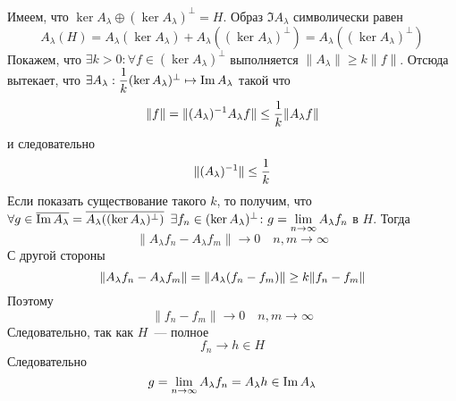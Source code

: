 \documentclass[14pt]{extarticle}
\begin{document}
\begin{Proof}
    Имеем, что $\ker A_\lambda \oplus (\ker A_\lambda)^\perp = H$.
    Образ $\Im A_\lambda$ символически равен
    $$
    A_\lambda(H) = A_\lambda(\ker A_\lambda) + A_\lambda((\ker A_\lambda)^
    \perp) = A_\lambda((\ker A_\lambda)^\perp)
    $$
    Покажем, что $\exists k > 0\colon \forall f \in (\ker A_\lambda)^\perp$
    выполняется $\|A_\lambda\| \ge k \|f\|$.
    Отсюда вытекает, что $\exists \Al : \dfrac{1}{k}(\ker A_\lambda)^\perp 
    \mapsto \Im 
    \Al$ такой что
    $$
    \|f\| = \|\Alo \Al f\| \le \dfrac{1}{k}\|\Al f\|
    $$
    и следовательно
    $$
    \|(A_\lambda)^{-1}\| \le \dfrac{1}{k}
    $$
    Если показать существование такого $k$, то получим, что $\forall g \in 
    \overline{\Im \Al} = \overline{\Al ((\ker A_\lambda)^\perp)}$ $\exists f_n
    \in (\ker A_\lambda)^\perp\colon g = \lim\limits_{n \to \infty}\Al f_n$ в
    $H$.
    Тогда
    $$
    \|A_\lambda f_n - A_\lambda f_m\| \to 0 \quad n,m \to \infty
    $$
    С другой стороны
    $$
    \|\Al f_n - \Al f_m\| = \| \Al (f_n - f_m)\| \ge k \|f_n - f_m\|
    $$
    Поэтому
    $$
    \|f_n - f_m\| \to 0 \quad n,m \to \infty
    $$
    Следовательно, так как $H$~--- полное
    $$
    f_n \to h \in H
    $$
    Следовательно
    $$
    g = \lim_{n \to \infty}\Al f_n = \Al h \in \Im \Al
    $$
    

\end{Proof}
\end{document}
